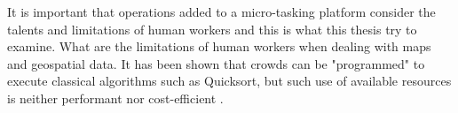 It is important that operations added to a micro-tasking platform consider the talents and limitations of human workers \citep{Franklin2011} and this is what this thesis try to examine. What are the limitations of human workers when dealing with maps and geospatial data. It has been shown that crowds can be "programmed" to execute classical algorithms such as Quicksort, but such use of available resources is neither performant nor cost-efficient \citep{Franklin2011}. 

